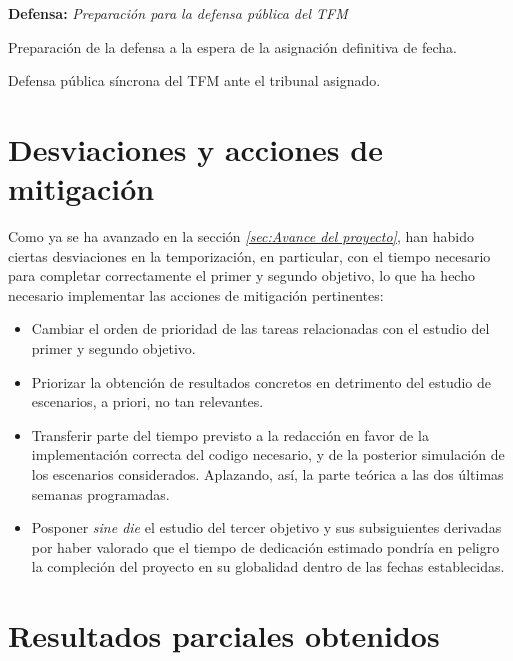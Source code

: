 \documentclass[IB,BIB]{TFUOC}%
\begin{document}
\begin{todolist}
  \item \textbf{Defensa:} \textit{Preparación para la defensa pública del TFM}
  \begin{todolist}
  \item Preparación de la defensa a la espera de la asignación definitiva de fecha.
  \item Defensa pública síncrona del TFM ante el tribunal asignado.
  \end{todolist}
\end{todolist}


\section{Desviaciones y acciones de mitigación}
\label{sec:Desviaciones y acciones de mitigación}

Como ya se ha avanzado en la sección \textit{\ref{sec:Avance del proyecto}}, han habido ciertas desviaciones en la temporización, en particular, con el tiempo necesario para completar correctamente el primer y segundo objetivo, lo que ha hecho necesario implementar las acciones de mitigación pertinentes:

\footnotesize

\begin{itemize}
    \item Cambiar el orden de prioridad de las tareas relacionadas con el estudio del primer y segundo objetivo.
    \item Priorizar la obtención de resultados concretos en detrimento del estudio de escenarios, a priori, no tan relevantes.
    \item Transferir parte del tiempo previsto a la redacción en favor de la implementación correcta del codigo necesario, y de la posterior simulación de los escenarios considerados. Aplazando, así, la parte teórica a las dos últimas semanas programadas. 
    \item Posponer \textit{sine die} el estudio del tercer objetivo y sus subsiguientes derivadas por haber valorado que el tiempo de dedicación estimado pondría en peligro la compleción del proyecto en su globalidad dentro de las fechas establecidas.
\end{itemize}

\normalsize


\section{Resultados parciales obtenidos}
\label{sec:Resultados parciales obtenidos}
\end{document}

